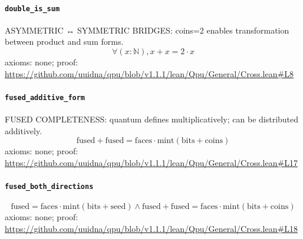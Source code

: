\documentclass[11pt]{article}
\begin{document}
\paragraph{\texttt{double\_is\_sum}}
ASYMMETRIC ↔ SYMMETRIC BRIDGES: coins=2 enables transformation between product and sum forms.
\[ \forall (x : \mathbb{N}), x + x = 2 \cdot x \]
\noindent axioms: none; proof: \url{https://github.com/uuidna/qpu/blob/v1.1.1/lean/Qpu/General/Cross.lean\#L8}

\paragraph{\texttt{fused\_additive\_form}}
FUSED COMPLETENESS: quantum defines multiplicatively; can be distributed additively.
\[ \mathrm{fused} + \mathrm{fused} = \mathrm{faces} \cdot \mathrm{mint} (\mathrm{bits} + \mathrm{coins}) \]
\noindent axioms: none; proof: \url{https://github.com/uuidna/qpu/blob/v1.1.1/lean/Qpu/General/Cross.lean\#L17}

\paragraph{\texttt{fused\_both\_directions}}
\[ \mathrm{fused} = \mathrm{faces} \cdot \mathrm{mint} (\mathrm{bits} + \mathrm{seed}) \land \mathrm{fused} + \mathrm{fused} = \mathrm{faces} \cdot \mathrm{mint} (\mathrm{bits} + \mathrm{coins}) \]
\noindent axioms: none; proof: \url{https://github.com/uuidna/qpu/blob/v1.1.1/lean/Qpu/General/Cross.lean\#L18}
\end{document}
